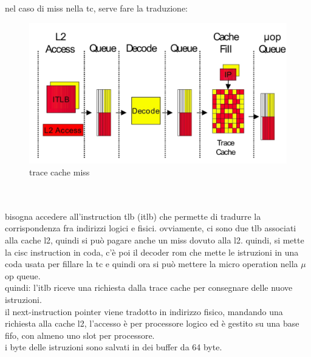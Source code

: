\documentclass[12pt, oneside]{extbook} %
\begin{document}
nel caso di miss nella tc, serve fare la traduzione:\\
\begin{figure}
	\includegraphics[scale=0.3]{immagini/trace_cache_miss.png}
	\caption{trace cache miss}
\end{figure}
\\\\
bisogna accedere all'instruction tlb (itlb) che permette di tradurre la corrispondenza fra indirizzi logici e fisici. ovviamente, ci sono due tlb associati alla cache l2, quindi si può pagare anche un miss dovuto alla l2. quindi, si mette la cisc instruction in coda, c'è poi il decoder rom che mette le istruzioni in una coda usata per fillare la tc e quindi ora si può mettere la micro operation nella $\mu$op queue.\\quindi: l'itlb riceve una richiesta dalla trace cache per consegnare delle nuove istruzioni.\\il next-instruction pointer viene tradotto in indirizzo fisico, mandando una richiesta alla cache l2, l'accesso è per processore logico ed è gestito su una base fifo, con almeno uno slot per processore.\\i byte delle istruzioni sono salvati in dei buffer da 64 byte.
\end{document}
